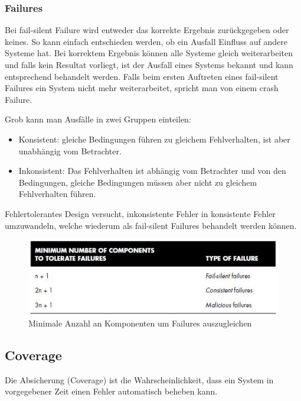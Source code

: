 \subsubsection*{Failures}
 Bei fail-silent Failure wird entweder das korrekte Ergebnis zurückgegeben oder keines. So kann einfach entschieden werden, ob ein Ausfall Einfluss auf andere Systeme hat. Bei korrektem Ergebnis können alle Systeme gleich weiterarbeiten und falls kein Resultat vorliegt, ist der Ausfall eines Systems bekannt und kann entsprechend behandelt werden. Falls beim ersten Auftreten eines fail-silent Failures ein System nicht mehr weiterarbeitet, spricht man von einem crash Failure.

Grob kann man Ausfälle in zwei Gruppen einteilen:

\begin{itemize}
    \item Konsistent: gleiche Bedingungen führen zu gleichem Fehlverhalten, ist aber unabhängig vom Betrachter.
    \item Inkonsistent: Das Fehlverhalten ist abhängig vom Betrachter und von den Bedingungen, gleiche Bedingungen müssen aber nicht zu gleichem Fehlverhalten führen.
\end{itemize}

Fehlertolerantes Design versucht, inkonsistente Fehler in konsistente Fehler umzuwandeln, welche wiederum als fail-silent Failures behandelt werden können.

\begin{figure}[H]
	\centering
	\includegraphics[width=\textwidth]{content/faulttolerance/images/failure-redundancy-num-components.jpg}
	\caption{Minimale Anzahl an Komponenten um Failures auszugleichen}
\end{figure}

\subsection*{Coverage}
 Die Absicherung (Coverage) ist die Wahrscheinlichkeit, dass ein System in vorgegebener Zeit einen Fehler automatisch beheben kann.

